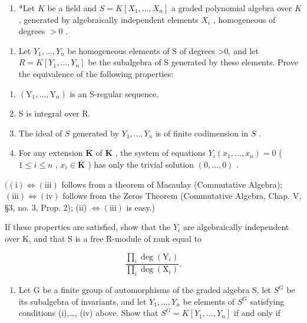 \begin{enumerate}
\def\labelenumi{\arabic{enumi})}
\setcounter{enumi}{4}
\tightlist
\item
  *Let \(K\) be a field and \(S = K[X_1, \ldots, X_n]\) a graded polynomial algebra over \(K\) , generated by algebraically independent elements \(X_i\) , homogeneous of degrees \(> 0\) .
\end{enumerate}

\begin{enumerate}
\def\labelenumi{\alph{enumi})}
\tightlist
\item
  Let \(Y_{1},\ldots,Y_{n}\) be homogeneous elements of S of degrees \textgreater0, and let \(R = K[Y_{1},\ldots,Y_{n}]\) be the subalgebra of S generated by these elements. Prove the equivalence of the following properties:
\end{enumerate}

\begin{enumerate}
\def\labelenumi{(\roman{enumi})}
\item
  \((\mathrm{Y}_1,\dots ,\mathrm{Y}_n)\) is an S-regular sequence.
\item
  S is integral over R.
\item
  The ideal of \(S\) generated by \(Y_{1},\ldots ,Y_{n}\) is of finite codimension in \(S\) .
\item
  For any extension \(\overline{\mathbf{K}}\) of \(\mathbf{K}\) , the system of equations \(Y_{i}(x_{1},\ldots ,x_{n}) = 0\) ( \(1\leqslant i\leqslant n\) , \(x_{i}\in \overline{\mathbf{K}}\) ) has only the trivial solution \((0,\dots ,0)\) .
\end{enumerate}

\(((\mathrm{i}) \Longleftrightarrow (\mathrm{iii})\) follows from a theorem of Macaulay (Commutative Algebra); \((\mathrm{iii}) \Longleftrightarrow (\mathrm{iv})\) follows from the Zeros Theorem (Commutative Algebra, Chap. V, §3, no. 3, Prop. 2); (ii) \(\Longleftrightarrow (\mathrm{iii})\) is easy.)

If these properties are satisfied, show that the \(Y_{i}\) are algebraically independent over K, and that S is a free R-module of rank equal to

\[
\frac {\prod_ {i} \deg (\mathrm{Y} _ {i})}{\prod_ {i} \deg (\mathrm{X} _ {i})}.
\]

\begin{enumerate}
\def\labelenumi{\alph{enumi})}
\setcounter{enumi}{1}
\tightlist
\item
  Let G be a finite group of automorphisms of the graded algebra S, let \(S^{G}\) be its subalgebra of invariants, and let \(Y_{1},\ldots,Y_{n}\) be elements of \(S^{G}\) satisfying conditions (i),\ldots, (iv) above. Show that \(S^{G}=K[Y_{1},\ldots,Y_{n}]\) if and only if
\end{enumerate}


